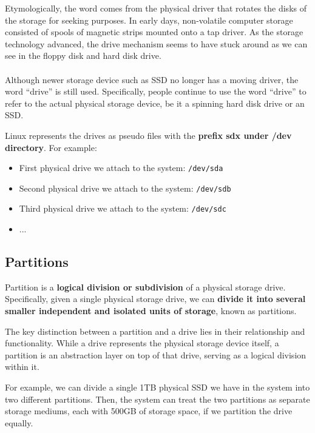 \documentclass{article}
\newenvironment{blocktemplateI}[1]{%
    \tcolorbox[beamer,%
    noparskip,breakable,
    colframe=Violet,%
    colbacklower=Black,%
    title=#1]}%
    {\endtcolorbox}
\begin{document}
\begin{blocktemplateI}{Note}
Etymologically, the word comes from the physical driver that rotates the disks of the storage for seeking purposes. In early days, non-volatile computer storage consisted of spools of magnetic strips mounted onto a tap driver. As the storage technology advanced, the drive mechanism seems to have stuck around as we can see in the floppy disk and hard disk drive.
\\\\
Although newer storage device such as SSD no longer has a moving driver, the word “drive” is still used. Specifically, people continue to use the word “drive” to refer to the actual physical storage device, be it a spinning hard disk drive or an SSD.
\end{blocktemplateI}


Linux represents the drives as pseudo files with the \textbf{prefix sdx under /dev directory}. For example:

\begin{itemize}
    \item First physical drive we attach to the system: \verb|/dev/sda|
    \item Second physical drive we attach to the system: \verb|/dev/sdb|
    \item Third physical drive we attach to the system: \verb|/dev/sdc|
    \item ...
\end{itemize}

\subsection{Partitions}
Partition is a \textbf{logical division or subdivision} of a physical storage drive. Specifically, given a single physical storage drive, we can \textbf{divide it into several smaller independent and isolated units of storage}, known as partitions.

The key distinction between a partition and a drive lies in their relationship and functionality. While a drive represents the physical storage device itself, a partition is an abstraction layer on top of that drive, serving as a logical division within it.

For example, we can divide a single 1TB physical SSD we have in the system into two different partitions. Then, the system can treat the two partitions as separate storage mediums, each with 500GB of storage space, if we partition the drive equally.
\end{document}
